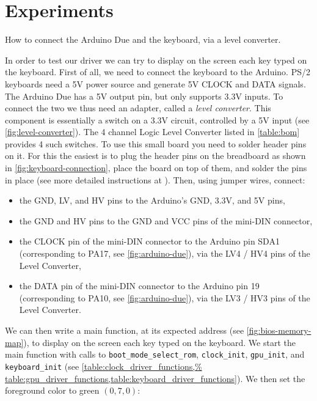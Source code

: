 \section{Experiments}

\begin{Figure}
  

  \caption{How to connect the Arduino Due and the keyboard, via a level
    converter.}\label{fig:keyboard-connection}
\end{Figure}

In order to test our driver we can try to display on the screen each key typed
on the keyboard. First of all, we need to connect the keyboard to the Arduino.
PS/2 keyboards need a 5V power source and generate 5V CLOCK and DATA signals.
The Arduino Due has a 5V output pin, but only supports 3.3V inputs. To connect
the two we thus need an adapter, called a {\em level converter}. This component
is essentially a switch on a 3.3V circuit, controlled by a 5V input (see
\cref{fig:level-converter}). The 4 channel Logic Level Converter listed in
\cref{table:bom} provides 4 such switches. To use this small board you need to
solder header pins on it. For this the easiest is to plug the header pins on
the breadboard as shown in \cref{fig:keyboard-connection}, place the board on
top of them, and solder the pins in place (see more detailed instructions at
). Then, using jumper wires, connect:
\begin{itemize}
  \item the GND, LV, and HV pins to the Arduino’s GND, 3.3V, and 5V pins,

  \item the GND and HV pins to the GND and VCC pins of the mini-DIN connector,

  \item the CLOCK pin of the mini-DIN connector to the Arduino pin SDA1
  (corresponding to PA17, see \cref{fig:arduino-due}), via the LV4 / HV4 pins
  of the Level Converter,

  \item the DATA pin of the mini-DIN connector to the Arduino pin 19
  (corresponding to PA10, see \cref{fig:arduino-due}), via the LV3 / HV3 pins
  of the Level Converter.
\end{itemize}

We can then write a main function, at its expected address
 (see \cref{fig:bios-memory-map}), to display on the
screen each key typed on the keyboard. We start the main function with calls to
\verb!boot_mode_select_rom!, \verb!clock_init!, \verb!gpu_init!, and
\verb!keyboard_init! (see \cref{table:clock_driver_functions,%
table:gpu_driver_functions,table:keyboard_driver_functions}). We then set the
foreground color to green $(0, 7, 0)$:

